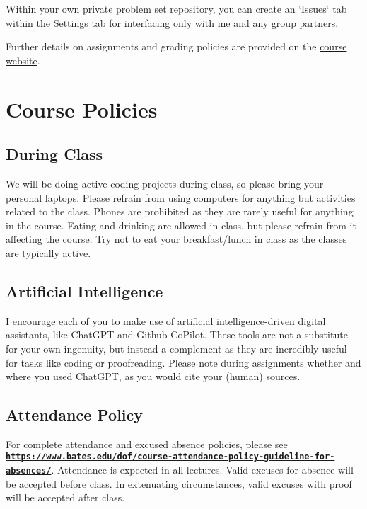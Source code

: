 \documentclass[11pt]{article}
\begin{document}
Within your own private problem set repository, you can create an `Issues` tab within the Settings tab for interfacing only with me and any group partners.

\medskip

Further details on assignments and grading policies are provided on the \href{https://github.com/big-data-and-economics/big-data-class-materials?tab=readme-ov-file#grading-policy}{course website}.

\newpage
\section*{Course Policies}

\subsection*{During Class}
\footnotesize{We will be doing active coding projects during class, so please bring your personal laptops. Please refrain from using computers for anything but activities related to the class. Phones are prohibited as they are rarely useful for anything in the course. Eating and drinking are allowed in class, but please refrain from it affecting the course. Try not to eat your breakfast/lunch in class as the classes are typically active.}

\subsection*{Artificial Intelligence}
\footnotesize{I encourage each of you to make use of artificial intelligence-driven digital assistants, like ChatGPT and Github CoPilot. These tools are not a substitute for your own ingenuity, but instead a complement as they are incredibly useful for tasks like coding or proofreading. Please note during assignments whether and where you used ChatGPT, as you would cite your (human) sources.}

\subsection*{Attendance Policy}
\footnotesize{For complete attendance and excused absence policies, please see \href{https://www.bates.edu/dof/course-attendance-policy-guideline-for-absences/}{\tt\bf https://www.bates.edu/dof/course-attendance-policy-guideline-for-absences/}. Attendance is expected in all lectures. Valid excuses for absence will be accepted before class. In extenuating circumstances, valid excuses with proof will be accepted after class.}
\end{document}
